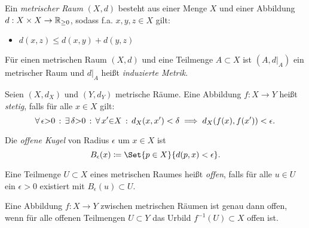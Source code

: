 \documentclass{cheat-sheet}
\begin{document}


\begin{defn}
  Ein \emph{metrischer Raum} $(X, d)$ besteht aus einer Menge $X$ und einer Abbildung $d : X \times X \to \mathbb{R}_{\geq 0}$, sodass f.a. $x,y,z \in X$ gilt:
  \begin{itemize}
    \item $d(x, z) \leq d(x, y) + d(y, z)$ 
  \end{itemize}
\end{defn}


\begin{defn}
  Für einen metrischen Raum $(X, d)$ und eine Teilmenge $A \subset X$ ist $(A, d|_A)$ ein metrischer Raum und $d|_A$ heißt \emph{induzierte Metrik}.
\end{defn}

\begin{defn}
  Seien $(X, d_X)$ und $(Y, d_Y)$ metrische Räume. Eine Abbildung $f : X \to Y$ heißt \emph{stetig}, falls für alle $x \in X$ gilt:
  \[ \forall \, {\epsilon {>} 0} \,:\, \exists \, {\delta {>} 0} \,:\, \forall \, {x' {\in} X} \,:\, d_X(x, x') < \delta \implies d_X(f(x), f(x')) < \epsilon. \]
\end{defn}

\begin{defn}
  Die \emph{offene Kugel} von Radius $\epsilon$ um $x \in X$ ist
  \[ B_\epsilon(x) \coloneqq \Set{ p \in X }{ d(p, x) < \epsilon }. \]
\end{defn}

\begin{defn}
  Eine Teilmenge $U \subset X$ eines metrischen Raumes heißt \emph{offen}, falls für alle $u \in U$ ein $\epsilon > 0$ existiert mit $B_{\epsilon}(u) \subset U$.
\end{defn}

\begin{prop}
  Eine Abbildung $f : X \to Y$ zwischen metrischen Räumen ist genau dann offen, wenn für alle offenen Teilmengen $U \subset Y$ das Urbild $f^{-1}(U) \subset X$ offen ist.
\end{prop}
\end{document}
